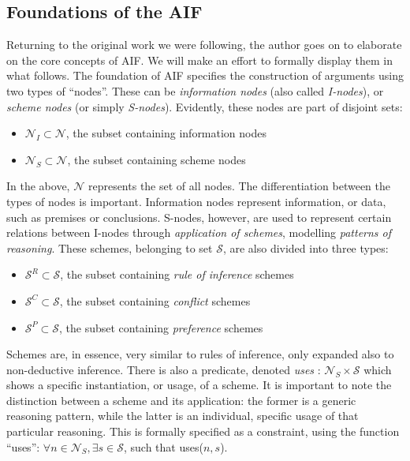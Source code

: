 \documentclass[12pt, a4paper]{article}
\begin{document}
\subsection{Foundations of the AIF}
Returning to the original work we were following, the author goes on to elaborate on the core concepts of AIF. We will make an effort to formally display them in what follows. The foundation of AIF specifies the construction of arguments using two types of ``nodes''. These can be \emph{information nodes} (also called \emph{I-nodes}), or \emph{scheme nodes} (or simply \emph{S-nodes}). Evidently, these nodes are part of disjoint sets:
\begin{itemize}
    \item $\mathcal{N}_I \subset \mathcal{N}$, the subset containing information nodes
    \item $\mathcal{N}_S \subset \mathcal{N}$, the subset containing scheme nodes
\end{itemize}
In the above, $\mathcal{N}$ represents the set of all nodes. The differentiation between the types of nodes is important. Information nodes represent information, or data, such as premises or conclusions. S-nodes, however, are used to represent certain relations between I-nodes through \emph{application of schemes}, modelling \emph{patterns of reasoning}. These schemes, belonging to set $\mathcal{S}$, are also divided into three types:
\begin{itemize}
    \item $\mathcal{S}^R \subset \mathcal{S}$, the subset containing \emph{rule of inference} schemes
    \item $\mathcal{S}^C \subset \mathcal{S}$, the subset containing \emph{conflict} schemes
    \item $\mathcal{S}^P \subset \mathcal{S}$, the subset containing \emph{preference} schemes
\end{itemize}
Schemes are, in essence, very similar to rules of inference, only expanded also to non-deductive inference. There is also a predicate, denoted \emph{uses} : $\mathcal{N}_S \times \mathcal{S}$ which shows a specific instantiation, or usage, of a scheme. It is important to note the distinction between a scheme and its application: the former is a generic reasoning pattern, while the latter is an individual, specific usage of that particular reasoning. This is formally specified as a constraint, using the function ``uses'': $\forall n \in \mathcal{N}_S, \exists s \in \mathcal{S}$, such that uses($n, s$).
\end{document}
